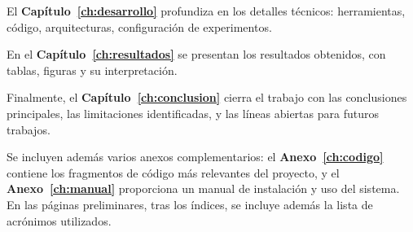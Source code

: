 El \textbf{Capítulo~\ref{ch:desarrollo}} profundiza en los detalles técnicos: herramientas, código, arquitecturas, configuración de experimentos.

En el \textbf{Capítulo~\ref{ch:resultados}} se presentan los resultados obtenidos, con tablas, figuras y su interpretación.

Finalmente, el \textbf{Capítulo~\ref{ch:conclusion}} cierra el trabajo con las conclusiones principales, las limitaciones identificadas, y las líneas abiertas para futuros trabajos.

Se incluyen además varios anexos complementarios: el \textbf{Anexo~\ref{ch:codigo}} contiene los fragmentos de código más relevantes del proyecto, y el \textbf{Anexo~\ref{ch:manual}} proporciona un manual de instalación y uso del sistema. En las páginas preliminares, tras los índices, se incluye además la lista de acrónimos utilizados.

